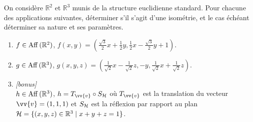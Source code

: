 \documentclass[a4paper,12pt,reqno]{amsart}
\begin{document}
\begin{exo}

  On considère $\mathbb{R}^{2}$ et $\mathbb{R}^{3}$ munis de la structure euclidienne standard. Pour chacune des applications suivantes, déterminer s'il s'agit d'une isométrie, et le cas échéant déterminer sa nature et ses paramètres.

  \begin{enumerate}
    \item $f \in \operatorname{Aff}{(\mathbb{R}^{2})}$, $f(x,y)=(\frac{\sqrt{3}}{2}x+\frac{1}{2}y,\frac{1}{2}x-\frac{\sqrt{3}}{2}y+1)$.
    \item $g \in \operatorname{Aff}{(\mathbb{R}^{3})}$, $g(x,y,z)=(\frac{1}{\sqrt{2}}x-\frac{1}{\sqrt{2}}z,-y,\frac{1}{\sqrt{2}}x+\frac{1}{\sqrt{2}}z)$.
    \item \textit{[bonus]}\\
    $h \in \operatorname{Aff}{(\mathbb{R}^{3})}$, $h=T_{\vv{v}} \circ S_{\ens{H}}$ où $T_{\vv{v}}$ est la translation du vecteur $\vv{v}=(1,1,1)$ et $S_{\mathcal{H}}$ est la réflexion par rapport au plan $\mathcal{H}=\{(x,y,z) \in \mathbb{R}^{3} \mid  x+y+z=1\}$.
  \end{enumerate}

\end{exo}
\end{document}
